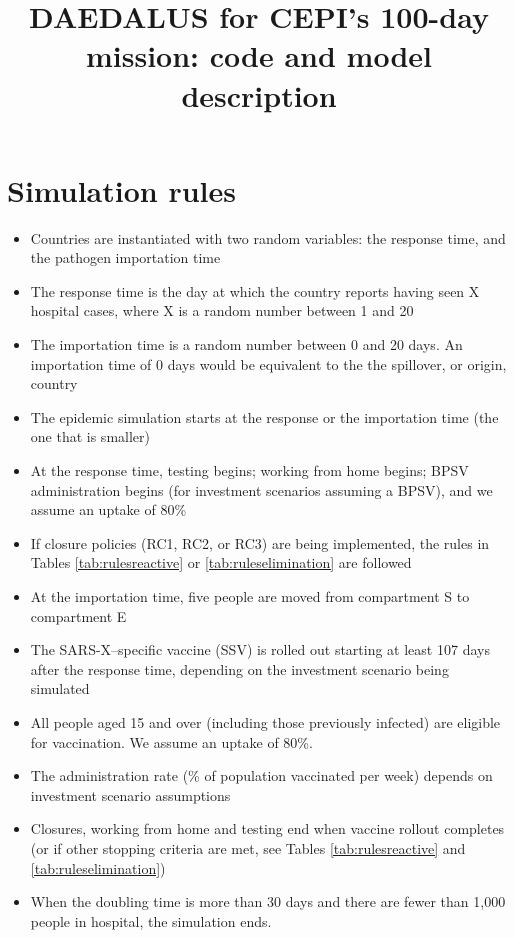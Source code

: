 \documentclass[
]{article}
\title{DAEDALUS for CEPI's 100-day mission: code and model description}
\author{}
\date{\vspace{-2.5em}}
\providecommand{\tightlist}{%
  \setlength{\itemsep}{0pt}\setlength{\parskip}{0pt}}
\begin{document}
\maketitle

\section{Simulation rules}\label{simulation-rules}

\begin{itemize}
\tightlist
\item
  Countries are instantiated with two random variables: the response time, and the pathogen importation time
\item
  The response time is the day at which the country reports having seen X hospital cases, where X is a random number between 1 and 20
\item
  The importation time is a random number between 0 and 20 days. An importation time of 0 days would be equivalent to the the spillover, or origin, country
\item
  The epidemic simulation starts at the response or the importation time (the one that is smaller)
\item
  At the response time, testing begins; working from home begins; BPSV administration begins (for investment scenarios assuming a BPSV), and we assume an uptake of 80\%
\item
  If closure policies (RC1, RC2, or RC3) are being implemented, the rules in Tables \ref{tab:rulesreactive} or \ref{tab:ruleselimination} are followed
\item
  At the importation time, five people are moved from compartment S to compartment E
\item
  The SARS-X--specific vaccine (SSV) is rolled out starting at least 107 days after the response time, depending on the investment scenario being simulated
\item
  All people aged 15 and over (including those previously infected) are eligible for vaccination. We assume an uptake of 80\%.
\item
  The administration rate (\% of population vaccinated per week) depends on investment scenario assumptions
\item
  Closures, working from home and testing end when vaccine rollout completes (or if other stopping criteria are met, see Tables \ref{tab:rulesreactive} and \ref{tab:ruleselimination})
\item
  When the doubling time is more than 30 days and there are fewer than 1,000 people in hospital, the simulation ends.
\end{itemize}
\end{document}
